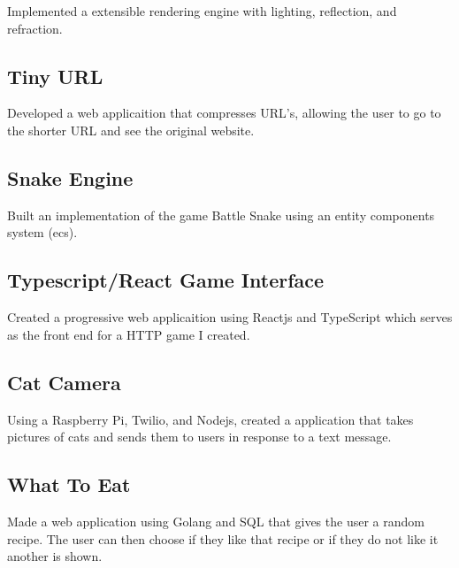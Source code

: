 \documentclass{article}
\newcommand{\hrefColored}[3]{\href{#2}{\color{#1}{#3}}}
\begin{document}
Implemented a extensible rendering engine with lighting, reflection, and 
refraction.

\subsection{Tiny URL \hrefColored{blue}{https://github.com/McRaeAlex/tinyURL}{github.com/McRaeAlex/tinyURL}}

Developed a web applicaition that compresses URL's, allowing the user to go to 
the shorter URL and see the original website.

\subsection{Snake Engine \hrefColored{blue}{https://github.com/McRaeAlex/dimensional-snake-engine}{github.com/McRaeAlex/dimensional-snake-engine}}

Built an implementation of the game Battle Snake using an entity components
system (ecs).

\subsection{Typescript/React Game Interface \hrefColored{blue}{https://github.com/McRaeAlex/DSnake-Typescript}{github.com/McRaeAlex/DSnake-Typescript}}

Created a progressive web applicaition using Reactjs and TypeScript which serves
as the front end for a HTTP game I created.

\subsection{Cat Camera \hrefColored{blue}{https://github.com/McRaeAlex/prettykitty}{github.com/McRaeAlex/prettykitty}}

Using a Raspberry Pi, Twilio, and Nodejs, created a application that takes 
pictures of cats and sends them to users in response to a text message.

\subsection{What To Eat \hrefColored{blue}{https://github.com/McRaeAlex/WhatToEat}{github.com/McRaeAlex/WhatToEat}}

Made a web application using Golang and SQL that gives the user a random recipe.
The user can then choose if they like that recipe or if they do not like it 
another is shown.
\end{document}
